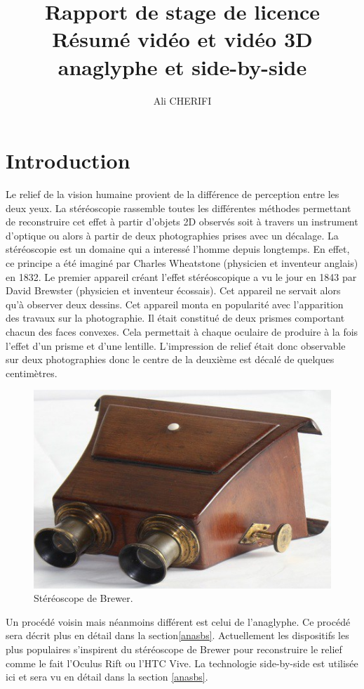 \documentclass[10pt,a4paper]{article}
\author{Ali CHERIFI}
\title{Rapport de stage de licence\\Résumé vidéo et vidéo 3D anaglyphe et side-by-side}
\begin{document}
\maketitle
\newpage
\tableofcontents
\newpage
\section{Introduction}
Le relief de la vision humaine provient de la différence de perception entre les deux yeux. La stéréoscopie rassemble toutes les différentes méthodes permettant de reconstruire cet effet à partir d'objets 2D
observés soit à travers un instrument d'optique ou alors à partir de deux photographies prises avec un décalage.
La stéréoscopie est un domaine qui a interessé l'homme depuis longtemps. En effet, ce principe a été imaginé par Charles Wheatstone\cite{stereoscopie} (physicien et inventeur anglais) en 1832.
Le premier appareil créant l'effet stéréoscopique a vu le jour en 1843 par David Brewster (physicien et inventeur écossais). Cet appareil ne servait alors qu'à observer deux dessins.
Cet appareil monta en popularité avec l'apparition des travaux sur la photographie. Il était constitué de deux prismes comportant chacun des faces convexes. Cela permettait à chaque oculaire de
produire à la fois l'effet d'un prisme et d'une lentille. L'impression de relief était donc observable sur deux photographies donc le centre de la deuxième est décalé de quelques centimètres.

\begin{figure}[!h]
\center
\includegraphics[scale = 0.5]{brewer.jpg}
\caption{Stéréoscope de Brewer\cite{brewster}.}
\end{figure}

Un procédé voisin mais néanmoins différent est celui de l'anaglyphe. Ce procédé sera décrit plus en détail dans la section\ref{anasbs}.
Actuellement les dispositifs les plus populaires s'inspirent du stéréoscope de Brewer pour reconstruire le relief comme le fait l'Oculus Rift ou l'HTC Vive. La technologie side-by-side est utilisée ici et
sera vu en détail dans la section \ref{anasbs}.
\end{document}
